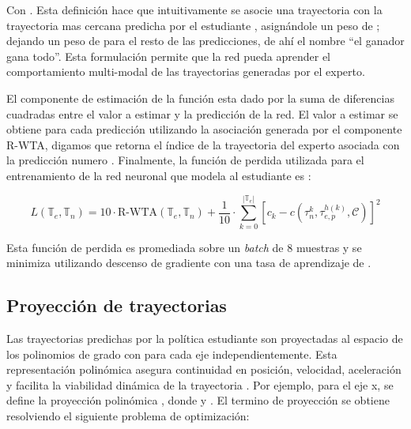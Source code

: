 Con . Esta definición hace que intuitivamente se asocie una trayectoria  con la trayectoria mas cercana predicha por el estudiante , asignándole un peso de ; dejando un peso de  para el resto de las predicciones, de ahí el nombre ``el ganador gana todo''. Esta formulación permite que la red pueda aprender el comportamiento multi-modal de las trayectorias generadas por el experto.

El componente de estimación de la función  esta dado por la suma de diferencias cuadradas entre el valor a estimar y la predicción de la red. El valor a estimar se obtiene para cada predicción utilizando la asociación generada por el componente R-WTA, digamos que  retorna el índice de la trayectoria del experto asociada con la predicción numero . Finalmente, la función de perdida utilizada para el entrenamiento de la red neuronal que modela al estudiante es \cite{Loquercio2021}:

\begin{equation}
\label{eq:aoa-student-spacial-loss-full}
    L(\mathbb{T}_e, \mathbb{T}_n) = 10 \cdot \text{R-WTA}(\mathbb{T}_e, \mathbb{T}_n) + \frac{1}{10} \cdot \sum_{k=0}^{|\mathbb{T}_e|} [c_k - c(\tau_{n}^{k}, \tau_{e,p}^{h(k)}, \mathcal{C})]^2
\end{equation}

Esta función de perdida es promediada sobre un \textit{batch} de 8 muestras y se minimiza utilizando descenso de gradiente con una tasa de aprendizaje de  \cite{Loquercio2021}.

\subsection{Proyección de trayectorias} 

\label{sec:prev-aoa-traj}

Las trayectorias predichas por la política estudiante son proyectadas al espacio de los polinomios de grado  con  para cada eje independientemente. Esta representación polinómica asegura continuidad en posición, velocidad, aceleración y facilita la viabilidad dinámica de la trayectoria \cite{mellinger2011minimum}. Por ejemplo, para el eje x, se define la proyección polinómica , donde  y . El termino de proyección  se obtiene resolviendo el siguiente problema de optimización:

